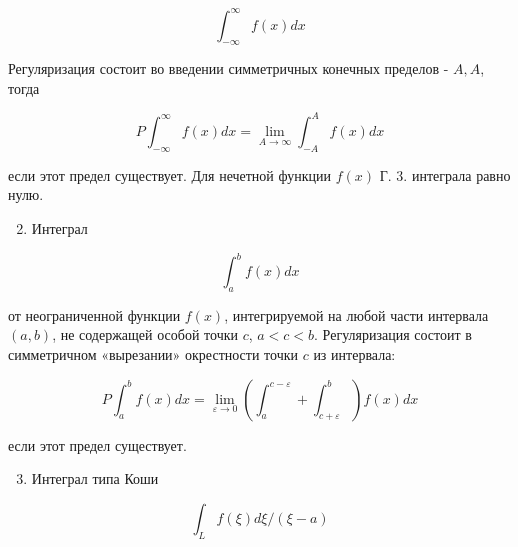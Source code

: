\documentclass[10pt]{article}
\begin{document}
\[

\int_{-\infty}^{\infty} f(x) d x

\]



Регуляризация состоит во введении симметричных конечных пределов - $A, A$, тогда



\[

P \int_{-\infty}^{\infty} f(x) d x=\lim _{A \rightarrow \infty} \int_{-A}^{A} f(x) d x

\]



если этот предел существует. Для нечетной функции $f(x)$ Г. 3. интеграла равно нулю.



\begin{enumerate}

  \setcounter{enumi}{1}

  \item Интеграл

\end{enumerate}



\[

\int_{a}^{b} f(x) d x

\]



от неограниченной функции $f(x)$, интегрируемой на любой части интервала $(a, b)$, не содержащей особой точки $c$, $a<c<b$. Регуляризация состоит в симметричном «вырезании» окрестности точки $c$ из интервала:



\[

P \int_{a}^{b} f(x) d x=\lim _{\varepsilon \rightarrow 0}\left(\int_{a}^{c-\varepsilon}+\int_{c+\varepsilon}^{b}\right) f(x) d x

\]



если этот предел существует.



\begin{enumerate}

  \setcounter{enumi}{2}

  \item Интеграл типа Коши

\end{enumerate}



\[

\int_{L} f(\xi) d \xi /(\xi-a)

\]
\end{document}
